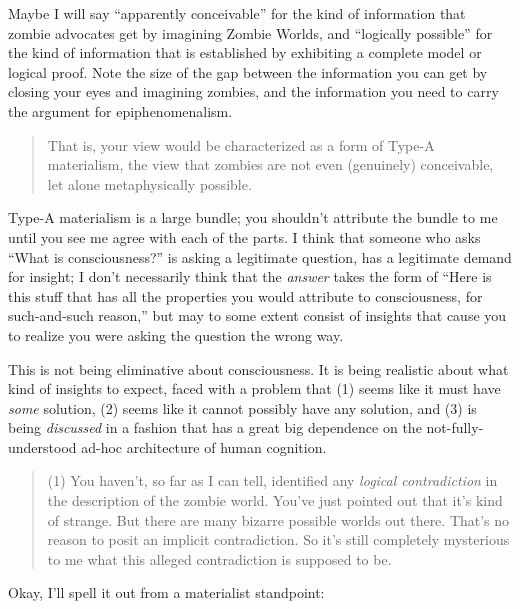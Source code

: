 {
 Maybe I will say ``apparently
conceivable'' for the kind of information that zombie
advocates get by imagining Zombie Worlds, and
``logically possible'' for the kind
of information that is established by exhibiting a complete model or
logical proof. Note the size of the gap between the information you can
get by closing your eyes and imagining zombies, and the information you
need to carry the argument for epiphenomenalism.}

\begin{quote}

{
 That is, your view would be characterized as a form of Type-A
materialism, the view that zombies are not even (genuinely)
conceivable, let alone metaphysically possible.}

\end{quote}

{
 Type-A materialism is a large bundle; you
shouldn't attribute the bundle to me until you see me
agree with each of the parts. I think that someone who asks
``What is consciousness?'' is asking
a legitimate question, has a legitimate demand for insight; I
don't necessarily think that the \textit{answer} takes
the form of ``Here is this stuff that has all the
properties you would attribute to consciousness, for such-and-such
reason,'' but may to some extent consist of insights
that cause you to realize you were asking the question the wrong way.}

{
 This is not being eliminative about consciousness. It is being
realistic about what kind of insights to expect, faced with a problem
that (1) seems like it must have \textit{some} solution, (2) seems like
it cannot possibly have any solution, and (3) is being
\textit{discussed} in a fashion that has a great big dependence on the
not-fully-understood ad-hoc architecture of human cognition.}

\begin{quote}
{
 (1) You haven't, so far as I can tell, identified
any \textit{logical contradiction} in the description of the zombie
world. You've just pointed out that
it's kind of strange. But there are many bizarre
possible worlds out there. That's no reason to posit an
implicit contradiction. So it's still completely
mysterious to me what this alleged contradiction is supposed to be.}
\end{quote}

{
 Okay, I'll spell it out from a materialist
standpoint:}

